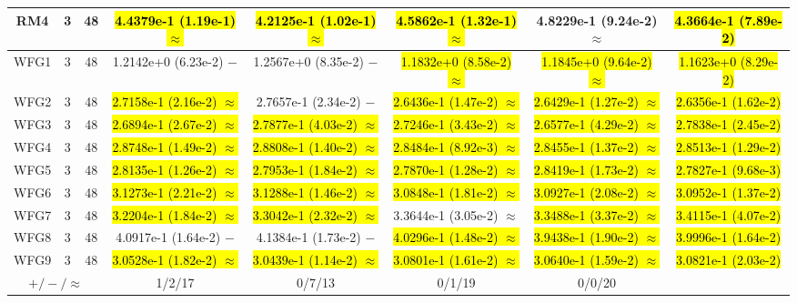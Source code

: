 \documentclass[journal]{IEEEtran}
\begin{document}
\begin{table*}[htbp]
\begin{tabular}{cccccccc}
\hline
\multirow{1}{*}{RM4}&3&48&\hl{4.4379e-1 (1.19e-1) $\approx$}&\hl{4.2125e-1 (1.02e-1) $\approx$}&\hl{4.5862e-1 (1.32e-1) $\approx$}&4.8229e-1 (9.24e-2) $\approx$&\hl{4.3664e-1 (7.89e-2)}\\
\hline
\multirow{1}{*}{WFG1}&3&48&1.2142e+0 (6.23e-2) $-$&1.2567e+0 (8.35e-2) $-$&\hl{1.1832e+0 (8.58e-2) $\approx$}&\hl{1.1845e+0 (9.64e-2) $\approx$}&\hl{1.1623e+0 (8.29e-2)}\\
\hline
\multirow{1}{*}{WFG2}&3&48&\hl{2.7158e-1 (2.16e-2) $\approx$}&2.7657e-1 (2.34e-2) $-$&\hl{2.6436e-1 (1.47e-2) $\approx$}&\hl{2.6429e-1 (1.27e-2) $\approx$}&\hl{2.6356e-1 (1.62e-2)}\\
\hline
\multirow{1}{*}{WFG3}&3&48&\hl{2.6894e-1 (2.67e-2) $\approx$}&\hl{2.7877e-1 (4.03e-2) $\approx$}&\hl{2.7246e-1 (3.43e-2) $\approx$}&\hl{2.6577e-1 (4.29e-2) $\approx$}&\hl{2.7838e-1 (2.45e-2)}\\
\hline
\multirow{1}{*}{WFG4}&3&48&\hl{2.8748e-1 (1.49e-2) $\approx$}&\hl{2.8808e-1 (1.40e-2) $\approx$}&\hl{2.8484e-1 (8.92e-3) $\approx$}&\hl{2.8455e-1 (1.37e-2) $\approx$}&\hl{2.8513e-1 (1.29e-2)}\\
\hline
\multirow{1}{*}{WFG5}&3&48&\hl{2.8135e-1 (1.26e-2) $\approx$}&\hl{2.7953e-1 (1.84e-2) $\approx$}&\hl{2.7870e-1 (1.28e-2) $\approx$}&\hl{2.8419e-1 (1.73e-2) $\approx$}&\hl{2.7827e-1 (9.68e-3)}\\
\hline
\multirow{1}{*}{WFG6}&3&48&\hl{3.1273e-1 (2.21e-2) $\approx$}&\hl{3.1288e-1 (1.46e-2) $\approx$}&\hl{3.0848e-1 (1.81e-2) $\approx$}&\hl{3.0927e-1 (2.08e-2) $\approx$}&\hl{3.0952e-1 (1.37e-2)}\\
\hline
\multirow{1}{*}{WFG7}&3&48&\hl{3.2204e-1 (1.84e-2) $\approx$}&\hl{3.3042e-1 (2.32e-2) $\approx$}&3.3644e-1 (3.05e-2) $\approx$&\hl{3.3488e-1 (3.37e-2) $\approx$}&\hl{3.4115e-1 (4.07e-2)}\\
\hline
\multirow{1}{*}{WFG8}&3&48&4.0917e-1 (1.64e-2) $-$&4.1384e-1 (1.73e-2) $-$&\hl{4.0296e-1 (1.48e-2) $\approx$}&\hl{3.9438e-1 (1.90e-2) $\approx$}&\hl{3.9996e-1 (1.64e-2)}\\
\hline
\multirow{1}{*}{WFG9}&3&48&\hl{3.0528e-1 (1.82e-2) $\approx$}&\hl{3.0439e-1 (1.14e-2) $\approx$}&\hl{3.0801e-1 (1.61e-2) $\approx$}&\hl{3.0640e-1 (1.59e-2) $\approx$}&\hl{3.0821e-1 (2.03e-2)}\\
\hline
\multicolumn{3}{c}{$+/-/\approx$}&1/2/17&0/7/13&0/1/19&0/0/20&\\
\bottomrule
\end{tabular}
\label{No Label}
\end{table*}
\end{document}
